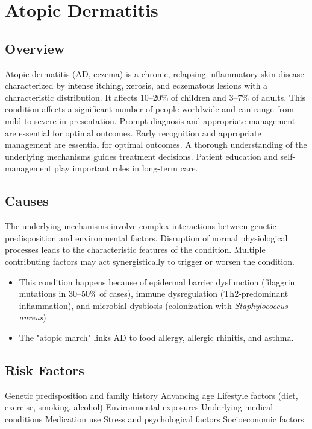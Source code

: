 \chapter{Atopic Dermatitis}
\label{sec:Atopic Dermatitis}

\section{Overview}
Atopic dermatitis (AD, eczema) is a chronic, relapsing inflammatory skin disease characterized by intense itching, xerosis, and eczematous lesions with a characteristic distribution. It affects 10--20\% of children and 3--7\% of adults. This condition affects a significant number of people worldwide and can range from mild to severe in presentation. Prompt diagnosis and appropriate management are essential for optimal outcomes. Early recognition and appropriate management are essential for optimal outcomes. A thorough understanding of the underlying mechanisms guides treatment decisions. Patient education and self-management play important roles in long-term care.
\section{Causes}
The underlying mechanisms involve complex interactions between genetic predisposition and environmental factors. Disruption of normal physiological processes leads to the characteristic features of the condition. Multiple contributing factors may act synergistically to trigger or worsen the condition.

\begin{itemize}[noitemsep]
  \item This condition happens because of epidermal barrier dysfunction (filaggrin mutations in 30--50\% of cases), immune dysregulation (Th2-predominant inflammation), and microbial dysbiosis (colonization with \textit{Staphylococcus aureus})
  \item The "atopic march" links AD to food allergy, allergic rhinitis, and asthma.
\end{itemize}
\section{Risk Factors}
Genetic predisposition and family history Advancing age Lifestyle factors (diet, exercise, smoking, alcohol) Environmental exposures Underlying medical conditions Medication use Stress and psychological factors Socioeconomic factors

